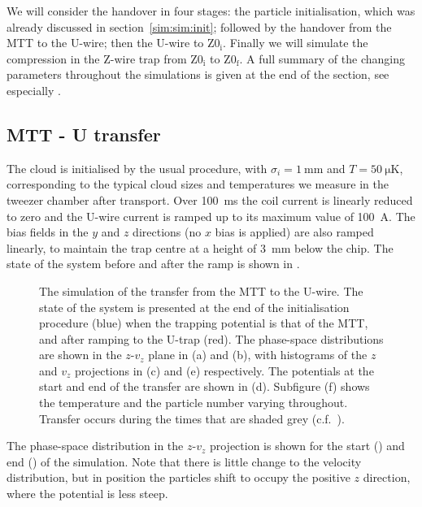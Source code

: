 We will consider the handover in four stages: the particle initialisation, which
was already discussed in section~\ref{sim:sim:init}; followed by the
handover from the MTT to the U-wire; then the U-wire to $\mathrm{Z0_i}$.
Finally we will simulate the compression in the Z-wire trap from
$\mathrm{Z0_i}$ to $\mathrm{Z0_f}$. A full summary of the changing parameters
throughout the simulations is given at the end of the section, see especially
.

\subsection{MTT - U transfer}
\label{sim:sim:trans_U}

The cloud is initialised by the usual procedure, with $\sigma_i =
\SI{1}{\milli\meter}$ and $T=\SI{50}{\micro\kelvin}$, corresponding to the
typical cloud sizes and temperatures we measure in the tweezer chamber after
transport. Over \SI{100}{\milli\second} the coil current is linearly
reduced to zero and the U-wire current is ramped up to its maximum value of
\SI{100}{\ampere}. The bias fields in the $y$ and $z$ directions (no $x$ bias
is applied) are also ramped linearly, to maintain the trap centre at a height
of \SI{3}{\milli\meter} below the chip. The state of the system before and
after the ramp is shown in .

\begin{figure}[p]
\centering
  \caption[Simulation of transfer from MTT to U-trap]{
    The simulation of the transfer from the MTT to the U-wire. The state of the
    system is presented at the end of the initialisation procedure (blue) when
    the trapping potential is that of the MTT, and after ramping to the U-trap
    (red). The phase-space distributions are shown in the $z$-$v_z$ plane in
    (a) and (b), with histograms of the $z$ and $v_z$ projections in (c) and
    (e) respectively. The potentials at the start and end of the transfer are
    shown in (d). Subfigure (f) shows the temperature and the particle number
    varying throughout. Transfer occurs during the times that are shaded grey
    (c.f.~).
  }
  \label{sim:fig:mttusim}
\end{figure}

The phase-space distribution in the $z$-$v_z$ projection is shown for the start
() and end
() of the simulation. Note that there is
little change to the velocity distribution, but in position the particles shift
to occupy the positive $z$ direction, where the potential is less steep.


